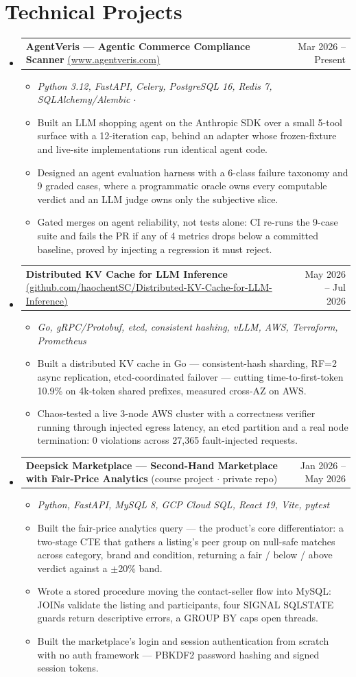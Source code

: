 \documentclass[letterpaper,11pt]{article}
\makeatletter
\newcommand{\resumeItem}[1]{
  \item\small{
    {#1 \vspace{-2pt}}
  }
}
\newcommand{\resumeProjectHeading}[2]{
    \item
    \begin{tabular*}{0.97\textwidth}{l@{\extracolsep{\fill}}r}
      \small#1 & #2 \\
    \end{tabular*}\vspace{-7pt}
}
\newcommand{\resumeSubHeadingListStart}{\begin{itemize}[leftmargin=0.15in, label={}]}
\newcommand{\resumeSubHeadingListEnd}{\end{itemize}}
\newcommand{\resumeItemListStart}{\begin{itemize}}
\newcommand{\resumeItemListEnd}{\end{itemize}\vspace{-5pt}}
\makeatother
\begin{document}
\section{Technical Projects}
  \resumeSubHeadingListStart
\resumeProjectHeading
  {\textbf{AgentVeris --- Agentic Commerce Compliance Scanner} \href{https://www.agentveris.com/}{\scriptsize(www.agentveris.com)}}{Mar 2026 -- Present}
  \resumeItemListStart
    \resumeItem{\emph{Python 3.12, FastAPI, Celery, PostgreSQL 16, Redis 7, SQLAlchemy/Alembic $\cdot$}}
    \resumeItem{Built an LLM shopping agent on the Anthropic SDK over a small 5-tool surface with a 12-iteration cap, behind an adapter whose frozen-fixture and live-site implementations run identical agent code.}
    \resumeItem{Designed an agent evaluation harness with a 6-class failure taxonomy and 9 graded cases, where a programmatic oracle owns every computable verdict and an LLM judge owns only the subjective slice.}
    \resumeItem{Gated merges on agent reliability, not tests alone: CI re-runs the 9-case suite and fails the PR if any of 4 metrics drops below a committed baseline, proved by injecting a regression it must reject.}
  \resumeItemListEnd

\resumeProjectHeading
  {\textbf{Distributed KV Cache for LLM Inference} \href{https://github.com/haochentSC/Distributed-KV-Cache-for-LLM-Inference}{\scriptsize(github.com/haochentSC/Distributed-KV-Cache-for-LLM-Inference)}}{May 2026 -- Jul 2026}
  \resumeItemListStart
    \resumeItem{\emph{Go, gRPC/Protobuf, etcd, consistent hashing, vLLM, AWS, Terraform, Prometheus}}
    \resumeItem{Built a distributed KV cache in Go --- consistent-hash sharding, RF=2 async replication, etcd-coordinated failover --- cutting time-to-first-token 10.9\% on 4k-token shared prefixes, measured cross-AZ on AWS.}
    \resumeItem{Chaos-tested a live 3-node AWS cluster with a correctness verifier running through injected egress latency, an etcd partition and a real node termination: 0 violations across 27,365 fault-injected requests.}
  \resumeItemListEnd

\resumeProjectHeading
  {\textbf{Deepsick Marketplace --- Second-Hand Marketplace with Fair-Price Analytics} {\scriptsize(course project $\cdot$ private repo)}}{Jan 2026 -- May 2026}
  \resumeItemListStart
    \resumeItem{\emph{Python, FastAPI, MySQL 8, GCP Cloud SQL, React 19, Vite, pytest}}
    \resumeItem{Built the fair-price analytics query --- the product's core differentiator: a two-stage CTE that gathers a listing's peer group on null-safe matches across category, brand and condition, returning a fair / below / above verdict against a $\pm$20\% band.}
    \resumeItem{Wrote a stored procedure moving the contact-seller flow into MySQL: JOINs validate the listing and participants, four SIGNAL SQLSTATE guards return descriptive errors, a GROUP BY caps open threads.}
    \resumeItem{Built the marketplace's login and session authentication from scratch with no auth framework --- PBKDF2 password hashing and signed session tokens.}
  \resumeItemListEnd
  \resumeSubHeadingListEnd
\end{document}
